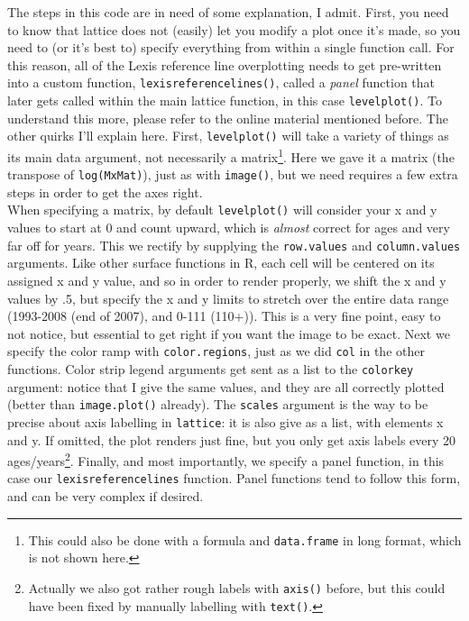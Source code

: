 

The steps in this code are in need of some explanation, I admit. First, you need to know that lattice does not (easily) let you modify a plot once it's made, so you need to (or it's best to) specify everything from within a single function call. For this reason, all of the Lexis reference line overplotting needs to get pre-written into a custom function, \texttt{lexisreferencelines()}, called a \textit{panel} function that later gets called within the main lattice function, in this case \texttt{levelplot()}. To understand this more, please refer to the online material mentioned before. The other quirks I'll explain here. First, \texttt{levelplot()} will take a variety of things as its main data argument, not necessarily a matrix\footnote{This could also be done with a formula and \texttt{data.frame} in long format, which is not shown here.}. Here we gave it a matrix (the transpose of \texttt{log(MxMat)}), just as with \texttt{image()}, but we need requires a few extra steps in order to get the axes right.\\

When specifying a matrix, by default \texttt{levelplot()} will consider your x and y values to start at 0 and count upward, which is \textit{almost} correct for ages and very far off for years. This we rectify by supplying the \texttt{row.values} and \texttt{column.values} arguments. Like other surface functions in R, each cell will be centered on its assigned x and y value, and so in order to render properly, we shift the x and y values by .5, but specify the x and y limits to stretch over the entire data range (1993-2008 (end of 2007), and 0-111 (110+)). This is a very fine point, easy to not notice, but essential to get right if you want the image to be exact. Next we specify the color ramp with \texttt{color.regions}, just as we did \texttt{col} in the other functions. Color strip legend arguments get sent as a list to the \texttt{colorkey} argument: notice that I give the same values, and they are all correctly plotted (better than \texttt{image.plot()} already). The \texttt{scales} argument is the way to be precise about axis labelling in \texttt{lattice}: it is also give as a list, with elements x and y. If omitted, the plot renders just fine, but you only get axis labels every 20 ages/years\footnote{Actually we also got rather rough labels with \texttt{axis()} before, but this could have been fixed by manually labelling with \texttt{text()}.}. Finally, and most importantly, we specify a panel function, in this case our \texttt{lexisreferencelines} function. Panel functions tend to follow this form, and can be very complex if desired.

